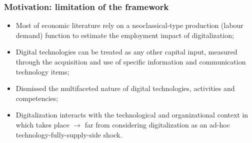 \documentclass[10pt,xcolor={usenames,dvipsnames}]{beamer}
\begin{document}
\begin{frame}
\frametitle{Motivation: limitation of the framework}
\begin{itemize}
\item Most of economic literature rely on a neoclassical-type production (labour demand) function  to estimate the employment impact of digitalization;
\medskip
\item Digital technologies can be treated as any other capital input, measured through the acquisition and use of specific information and communication technology items;
\medskip
\item Dismissed the multifaceted nature of digital technologies, activities and competencies;
\medskip
\item Digitalization interacts with the technological and organizational context in which takes place $\rightarrow$ far from considering digitalization as an ad-hoc technology-fully-supply-side shock.
\end{itemize}
\end{frame}

\end{document}
